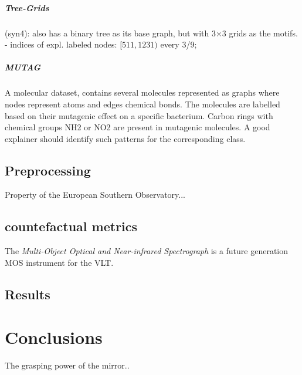 \documentclass[binding=0.6cm]{sapthesis}
\begin{document}
\paragraph{Tree-Grids}
(syn4): also has a binary tree as its base graph, but with 3×3 grids as the motifs.  - indices of expl. labeled nodes: $[511,1231)$ every 3/9;

\paragraph{MUTAG}
A molecular dataset, contains several molecules represented as graphs where nodes represent atoms and edges chemical bonds. The molecules are labelled based on their mutagenic effect on a specific bacterium. Carbon rings with chemical groups NH2 or NO2 are present in mutagenic molecules. A good explainer should identify such patterns for the corresponding class.


\section{Preprocessing}
\label{sec:expRes.preprocessing}
Property of the European Southern Observatory...

\section{countefactual metrics}
\label{sec:expRes.cf-metrics}
The \textit{Multi-Object Optical and Near-infrared Spectrograph} is a future generation MOS instrument for the VLT. 

\section{Results}
\label{sec:expRes-res}




\chapter{Conclusions}
\label{chap:5-conclusions} 
The grasping power of the mirror..




\backmatter
\cleardoublepage %

\printbibheading
\printbibliography[type=article,heading=subbibliography,title={Articles}]
\printbibliography[type=inbook,heading=subbibliography,title={Inproceedings}]
\printbibliography[type=book,heading=subbibliography,title={Books}]
\printbibliography[type=misc,heading=subbibliography,title={Miscellaneous}]
\end{document}
